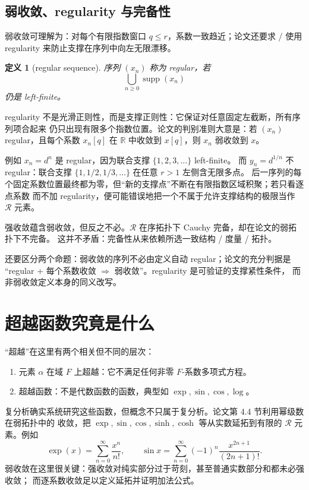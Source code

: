 \documentclass[11pt,a4paper]{article}
\newtheorem{definition}{定义}[section]
\theoremstyle{remark}
\newcommand{\LC}{\mathcal R}
\newcommand{\supp}{\operatorname{supp}}
\newcommand{\R}{\mathbb R}
\begin{document}
\subsection{弱收敛、regularity 与完备性}

弱收敛可理解为：对每个有限指数窗口 $q\le r$，系数一致趋近；论文还要求 / 使用
regularity 来防止支撑在序列中向左无限漂移。

\begin{definition}[regular sequence]
序列 $(x_n)$ 称为 regular，若
\[
\bigcup_{n\ge0}\supp(x_n)
\]
仍是 left-finite。
\end{definition}

regularity 不是光滑正则性，而是支撑正则性：它保证对任意固定左截断，所有序列项合起来
仍只出现有限多个指数位置。论文的判别准则大意是：若 $(x_n)$ regular，且每个系数
$x_n[q]$ 在 $\R$ 中收敛到 $x[q]$，则 $x_n$ 弱收敛到 $x$。

例如 $x_n=d^n$ 是 regular，因为联合支撑 $\{1,2,3,\dots\}$ left-finite。
而 $y_n=d^{1/n}$ 不 regular：联合支撑 $\{1,1/2,1/3,\dots\}$ 在任意 $r>1$ 左侧含无限多点。
后一序列的每个固定系数位置最终都为零，但“新的支撑点”不断在有限指数区域积聚；若只看逐点系数
而不加 regularity，便可能错误地把一个不属于允许支撑结构的极限当作 $\LC$ 元素。

强收敛蕴含弱收敛，但反之不必。$\LC$ 在序拓扑下 Cauchy 完备，却在论文的弱拓扑下不完备。
这并不矛盾：完备性从来依赖所选一致结构 / 度量 / 拓扑。

还要区分两个命题：弱收敛的序列不必由定义自动 regular；论文的充分判据是
“regular $+$ 每个系数收敛 $\Rightarrow$ 弱收敛”。regularity 是可验证的支撑紧性条件，
而非弱收敛定义本身的同义改写。

\section{超越函数究竟是什么}

“超越”在这里有两个相关但不同的层次：

\begin{enumerate}
\item 元素 $\alpha$ 在域 $F$ 上超越：它不满足任何非零 $F$-系数多项式方程。
\item 超越函数：不是代数函数的函数，典型如 $\exp,\sin,\cos,\log$。
\end{enumerate}

复分析确实系统研究这些函数，但概念不只属于复分析。论文第 4.4 节利用幂级数在弱拓扑中的
收敛，把 $\exp,\sin,\cos,\sinh,\cosh$ 等从实数延拓到有限的 $\LC$ 元素。例如
\[
\exp(x)=\sum_{n=0}^{\infty}\frac{x^n}{n!},\qquad
\sin x=\sum_{n=0}^{\infty}(-1)^n\frac{x^{2n+1}}{(2n+1)!}.
\]
弱收敛在这里很关键：强收敛对纯实部分过于苛刻，甚至普通实数部分和都未必强收敛；
而逐系数收敛足以定义延拓并证明加法公式。
\end{document}
